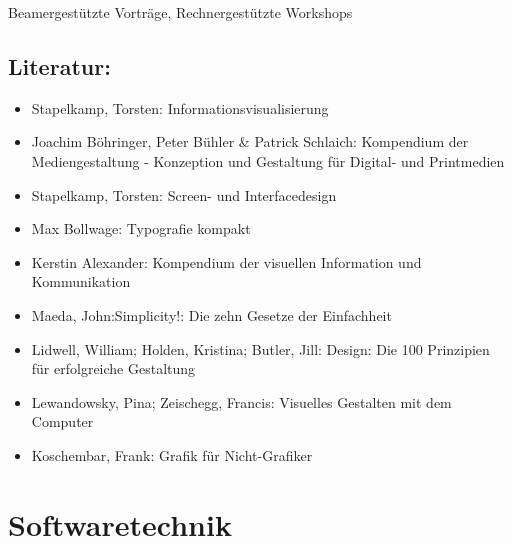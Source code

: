 Beamergestützte Vorträge, Rechnergestützte Workshops

\section*{Literatur:}\label{literatur-17}

\begin{itemize}
\item
  Stapelkamp, Torsten: Informationsvisualisierung
\item
  Joachim Böhringer, Peter Bühler \& Patrick Schlaich: Kompendium der
  Mediengestaltung - Konzeption und Gestaltung für Digital- und
  Printmedien
\item
  Stapelkamp, Torsten: Screen- und Interfacedesign
\item
  Max Bollwage: Typografie kompakt
\item
  Kerstin Alexander: Kompendium der visuellen Information und
  Kommunikation
\item
  Maeda, John:Simplicity!: Die zehn Gesetze der Einfachheit
\item
  Lidwell, William; Holden, Kristina; Butler, Jill: Design: Die 100
  Prinzipien für erfolgreiche Gestaltung
\item
  Lewandowsky, Pina; Zeischegg, Francis: Visuelles Gestalten mit dem
  Computer
\item
  Koschembar, Frank: Grafik für Nicht-Grafiker
\end{itemize}

\chapter{Softwaretechnik}\label{softwaretechnik}

